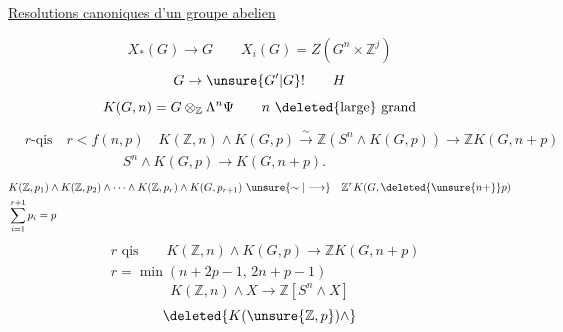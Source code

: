 \uline{Resolutions canoniques d'un groupe abelien}

\[
X_*(G)\longrightarrow G\qquad X_i(G)=Z(G^n\times\mathbb Z^j)
\]
\[
G\to \unsure{G'|G}!\qquad H
\]
\[
K(G,n)=G\otimes_{\mathbb Z}\Lambda^n\Psi\qquad n\ \deleted{\text{large}}\ \text{grand}
\]
\[
\begin{aligned}
&r\text{-qis}\quad r<f(n,p)\quad K(\mathbb Z,n)\wedge K(G,p)\xrightarrow{\sim}\mathbb Z(S^n\wedge K(G,p))\longrightarrow\mathbb Z K(G,n+p)\\
&\hspace{7em} S^n\wedge K(G,p)\longrightarrow K(G,n+p).
\end{aligned}
\]
\[
\begin{aligned}
&K(\mathbb Z,p_1)\wedge K(\mathbb Z,p_2)\wedge\cdots\wedge K(\mathbb Z,p_r)\wedge K(G,p_{r+1})\ \unsure{\sim|\longrightarrow}\quad\mathbb Z^r K(G,\deleted{\unsure{n+}}p)\\
&\sum_{i=1}^{r+1}p_i=p
\end{aligned}
\]
\[
\begin{aligned}
&r\text{ qis}\qquad \boxed{K(\mathbb Z,n)\wedge K(G,p)\longrightarrow\mathbb Z K(G,n+p)}\\
&r=\min(n+2p-1,\,2n+p-1)
\end{aligned}
\]
\[
K(\mathbb Z,n)\wedge X\longrightarrow\mathbb Z[S^n\wedge X]
\]
\[
\deleted{K(\unsure{\mathbb Z,p})\wedge}
\]
